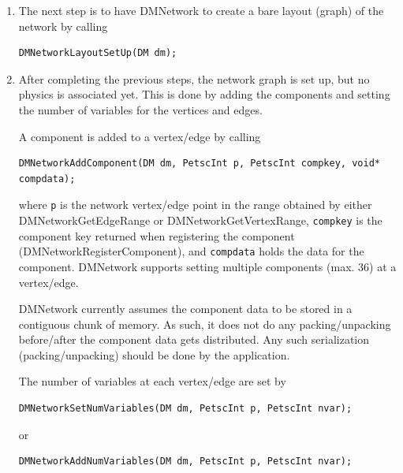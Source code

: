 \begin{enumerate}
As an example, consider a network comprising of 2 subnetworks that are coupled. The topological information for the network is as follows: \\
subnetwork 0: v0 --- v1 --- v2 --- v3 \\
subnetwork 1: v1 --- v2 --- v0 \\
coupling between subnetworks: subnetwork 1: v2 --- subnetwork 0: v0  \\
The \lstinline{edgelist} and \lstinline{edgelistCouple} for this network are \\
edgelist[0] = \{0,1,1,2,2,3\} \\
edgelist[1] = \{1,2,2,0\} \\
edgelistCouple[0] = \{1,2,0,0\}.

\item The next step is to have DMNetwork to create a bare layout (graph) of the network by calling
\begin{lstlisting}
DMNetworkLayoutSetUp(DM dm);
\end{lstlisting}

\item After completing the previous steps, the network graph is set up, but no physics is associated yet. This is done by adding the components and setting the number of variables for the vertices and edges.

A component is added to a vertex/edge by calling
\begin{lstlisting}
DMNetworkAddComponent(DM dm, PetscInt p, PetscInt compkey, void* compdata);
\end{lstlisting}
where \lstinline{p} is the network vertex/edge point in the range obtained by either DMNetworkGetEdgeRange or DMNetworkGetVertexRange, \lstinline{compkey} is the component key returned when registering the component (DMNetworkRegisterComponent), and \lstinline{compdata} holds the data for the component. DMNetwork supports setting multiple components (max. 36) at a vertex/edge.

DMNetwork currently assumes the component data to be stored in a contiguous chunk of memory. As such, it does not do any packing/unpacking before/after the component data gets distributed. Any such serialization (packing/unpacking) should be done by the application.
 
The number of variables at each vertex/edge are set by
\begin{lstlisting}
DMNetworkSetNumVariables(DM dm, PetscInt p, PetscInt nvar);
\end{lstlisting} or
\begin{lstlisting}
DMNetworkAddNumVariables(DM dm, PetscInt p, PetscInt nvar);
\end{lstlisting}


\end{enumerate}
